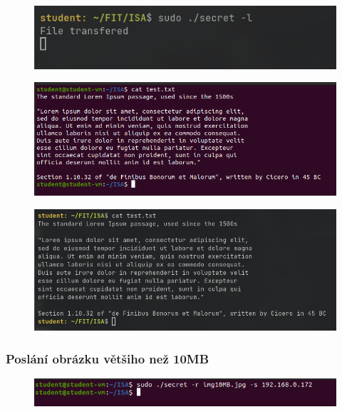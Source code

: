 \documentclass[11pt, a4paper]{article}
\begin{document}
\begin{flushleft}
  \begin{figure}[H]
    \centering
    \includegraphics[scale=0.89, keepaspectratio]{img/ub_send_txt2.png}
    \label{fig:txt}
 \end{figure}

\begin{figure}[H]
    \centering
    \includegraphics[scale=0.61, keepaspectratio]{img/ub_cmp_txt1.png}
    \label{fig:txt}
 \end{figure}
 
  \begin{figure}[H]
    \centering
    \includegraphics[scale=0.56, keepaspectratio]{img/ub_cmp_txt2.png}
    \label{fig:txt}
 \end{figure}


\subsubsection{Poslání obrázku většiho než 10MB}

\begin{figure}[H]
    \centering
    \includegraphics[scale=0.66, keepaspectratio]{img/ub_send_10.png}
    \label{fig:txt}
 \end{figure}
 

\end{flushleft}
\end{document}
